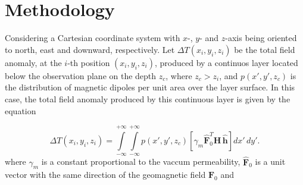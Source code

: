 \section{Methodology}
\label{sec:methodology}


Considering a Cartesian coordinate system with $x$-, $y$- and $z$-axis being oriented to north, east and downward, respectively. Let $\Delta T (x_i,y_i,z_i)$ be the total field anomaly, at the $i$-th position $(x_i,y_i,z_i)$, produced by a continuos layer located below the observation plane on the depth $z_c$, where $z_c > z_i$, and $p(x',y',z_c)$ is the distribution of magnetic dipoles per unit area over the layer surface. In this case, the total field anomaly produced by this continuous layer is given by the equation 

\begin{equation}
\Delta T(x_i,y_i,z_i) = \int \limits_{-\infty}^{+\infty } \int \limits_{-\infty}^{+\infty }  p(x',y',z_c)  [\gamma_m \hat{\mathbf{F}}_0^T \mathbf{H} \,\hat{\mathbf{h}}] dx' \,dy'.
\label{eq:continuous_layer}
\end{equation}
where $\gamma_m$ is a constant proportional to the vaccum permeability, $\hat{\mathbf{F}}_0$ is a unit vector with the same direction of the geomagnetic field $\mathbf{F}_0$ and 







  












